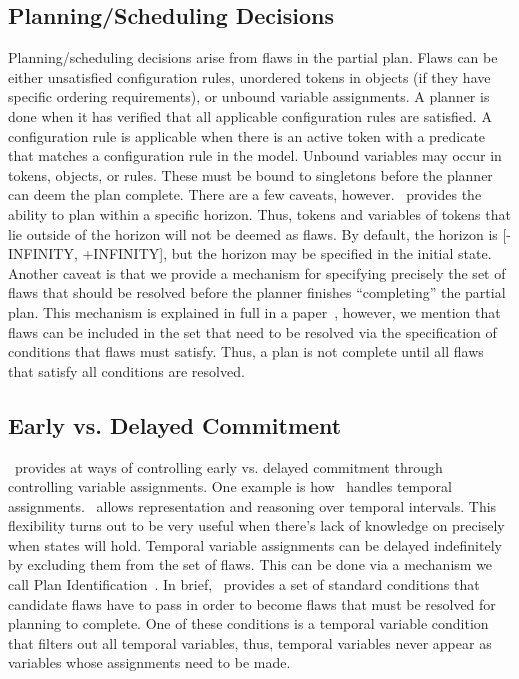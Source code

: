 \documentclass[10pt, letterpaper, twoside]{article}
\begin{document}
\subsection{Planning/Scheduling Decisions}
\label{decisions}
Planning/scheduling decisions arise from flaws in the partial plan.  Flaws
can be either unsatisfied configuration rules, unordered tokens in objects
(if they have specific ordering requirements), or unbound variable
assignments.  A planner is done when it has verified that all applicable
configuration rules are satisfied.  A configuration rule is applicable when
there is an active token with a predicate that matches a configuration rule
in the model.  Unbound variables may occur in tokens, objects, or rules.
These must be bound to singletons before the planner can deem the plan
complete.  There are a few caveats, however.  \ET\, provides the ability to
plan within a specific horizon.  Thus, tokens and variables of tokens that
lie outside of the horizon will not be deemed as flaws.  By default, the
horizon is [-INFINITY, +INFINITY], but the horizon may be specified in the
initial state. Another caveat is that we provide a mechanism for specifying
precisely the set of flaws that should be resolved before the planner
finishes ``completing'' the partial plan.  This mechanism is explained in
full in a paper~\cite{planid}, however, we mention that flaws can be
included in the set that need to be resolved via the specification of
conditions that flaws must satisfy.  Thus, a plan is not complete until all
flaws that satisfy all conditions are resolved.

\subsection{Early vs. Delayed Commitment}
\label{commitment}
\ET\, provides at ways of controlling early vs. delayed commitment through
controlling variable assignments.  One example is how \ET\, handles
temporal assignments.  \ET\, allows representation and reasoning over
temporal intervals.  This flexibility turns out to be very useful when
there's lack of knowledge on precisely when states will hold.  Temporal
variable assignments can be delayed indefinitely by excluding them from the
set of flaws.  This can be done via a mechanism we call Plan
Identification~\cite{planid}.  In brief, \ET\, provides a set of standard
conditions that candidate flaws have to pass in order to become flaws that
must be resolved for planning to complete.  One of these conditions is a
temporal variable condition that filters out all temporal variables, thus,
temporal variables never appear as variables whose assignments need to be
made. 
\end{document}
